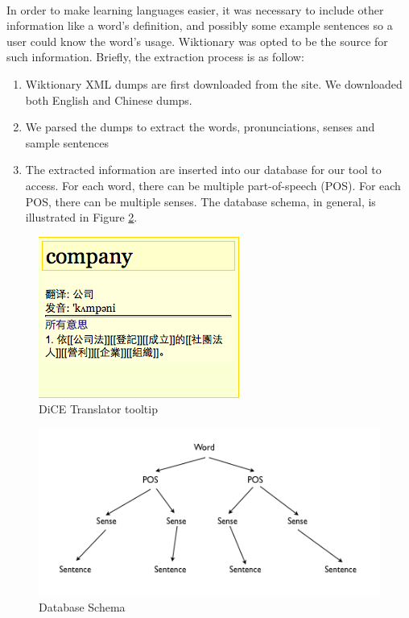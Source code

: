 \documentclass[12 pt]{article}
\begin{document}
\paragraph{}
In order to make learning languages easier, it was necessary to include other information like a word's definition, and possibly some example sentences so a user could know the word's usage. Wiktionary was opted to be the source for such information. Briefly, the extraction process is as follow:
\begin{enumerate}
\item{Wiktionary XML dumps are first downloaded from the site. We downloaded both English and Chinese dumps.}
\item{We parsed the dumps to extract the words, pronunciations, senses and sample sentences}
\item{The extracted information are inserted into our database for our tool to access. For each word, there can be multiple part-of-speech (POS). For each POS, there can be multiple senses. The database schema, in general, is illustrated in Figure \ref{schema}.}
\end{enumerate}
\begin{figure}[htbp]
  \centering
  \includegraphics[scale=0.8]{./tooltip}
  \caption{DiCE Translator tooltip}
  \label{tooltip}
\end{figure}
\begin{figure}[htbp]
  \centering
  \includegraphics[scale=0.8]{./schema}
  \caption{Database Schema}
  \label{schema}
\end{figure}
\end{document}
